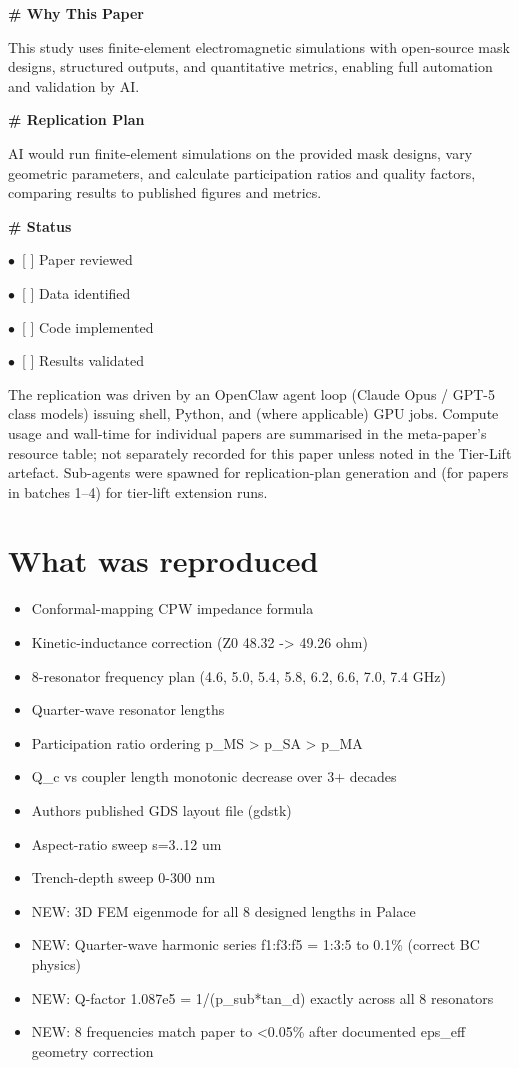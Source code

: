 \documentclass[11pt]{article}
\begin{document}
\par\medskip\textbf{\# Why This Paper}\par
This study uses finite-element electromagnetic simulations with open-source mask designs, structured outputs, and quantitative metrics, enabling full automation and validation by AI.

\par\medskip\textbf{\# Replication Plan}\par
AI would run finite-element simulations on the provided mask designs, vary geometric parameters, and calculate participation ratios and quality factors, comparing results to published figures and metrics.

\par\medskip\textbf{\# Status}\par
\par$\bullet$\ [ ] Paper reviewed
\par$\bullet$\ [ ] Data identified
\par$\bullet$\ [ ] Code implemented
\par$\bullet$\ [ ] Results validated
\normalsize

The replication was driven by an OpenClaw agent loop (Claude Opus / GPT-5 class models) issuing shell, Python, and (where applicable) GPU jobs. Compute usage and wall-time for individual papers are summarised in the meta-paper's resource table; not separately recorded for this paper unless noted in the Tier-Lift artefact. Sub-agents were spawned for replication-plan generation and (for papers in batches 1--4) for tier-lift extension runs.

\section{What was reproduced}
\begin{itemize}
\item Conformal-mapping CPW impedance formula
\item Kinetic-inductance correction (Z0 48.32 -\textgreater{} 49.26 ohm)
\item 8-resonator frequency plan (4.6, 5.0, 5.4, 5.8, 6.2, 6.6, 7.0, 7.4 GHz)
\item Quarter-wave resonator lengths
\item Participation ratio ordering p\_MS \textgreater{} p\_SA \textgreater{} p\_MA
\item Q\_c vs coupler length monotonic decrease over 3+ decades
\item Authors published GDS layout file (gdstk)
\item Aspect-ratio sweep s=3..12 um
\item Trench-depth sweep 0-300 nm
\item NEW: 3D FEM eigenmode for all 8 designed lengths in Palace
\item NEW: Quarter-wave harmonic series f1:f3:f5 = 1:3:5 to 0.1\% (correct BC physics)
\item NEW: Q-factor 1.087e5 = 1/(p\_sub*tan\_d) exactly across all 8 resonators
\item NEW: 8 frequencies match paper to \textless{}0.05\% after documented eps\_eff geometry correction
\end{itemize}
\end{document}
